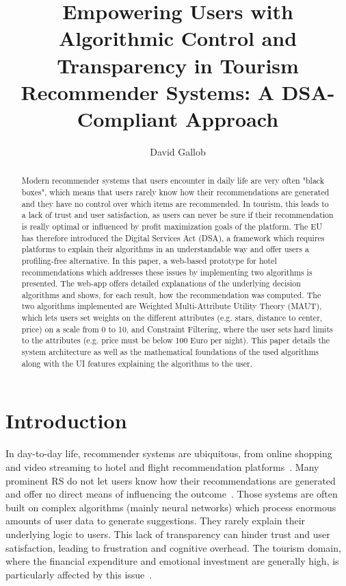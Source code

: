 \documentclass[acmlarge]{acmart}
\begin{document}
\title[Empowering Users with Algorithmic Control and Transparency]{Empowering Users with Algorithmic Control and Transparency in Tourism Recommender Systems: A DSA-Compliant Approach}

\author{David Gallob}

\renewcommand{\shortauthors}{Gallob}

\begin{abstract}
Modern recommender systems that users encounter in daily life are very often "black boxes", which means that users rarely know how their recommendations are generated and they have no control over which items are recommended. In tourism, this leads to a lack of trust and user satisfaction, as users can never be sure if their recommendation is really optimal or influenced by profit maximization goals of the platform. The EU has therefore introduced the Digital Services Act (DSA), a framework which requires platforms to explain their algorithms in an understandable way and offer users a profiling-free alternative. In this paper, a web-based prototype for hotel recommendations which addresses these issues by implementing two algorithms is presented. The web-app offers detailed explanations of the underlying decision algorithms and shows, for each result, how the recommendation was computed. The two algorithms implemented are Weighted Multi-Attribute Utility Theory (MAUT), which lets users set weights on the different attributes (e.g. stars, distance to center, price) on a scale from 0 to 10, and Constraint Filtering, where the user sets hard limits to the attributes (e.g. price must be below 100 Euro per night). This paper details the system architecture as well as the mathematical foundations of the used algorithms along with the UI features explaining the algorithms to the user.
\end{abstract}

\maketitle

\section{Introduction}
In day-to-day life, recommender systems are ubiquitous, from online shopping and video streaming to hotel and flight recommendation platforms~\cite{adomavicius2005toward}. Many prominent RS do not let users know how their recommendations are generated and offer no direct means of influencing the outcome~\cite{BORRAS20147370}. Those systems are often built on complex algorithms (mainly neural networks) which process enormous amounts of user data to generate suggestions. They rarely explain their underlying logic to users. This lack of transparency can hinder trust and user satisfaction, leading to frustration and cognitive overhead. The tourism domain, where the financial expenditure and emotional investment are generally high, is particularly affected by this issue~\cite{ricci2011travel}.
\end{document}
